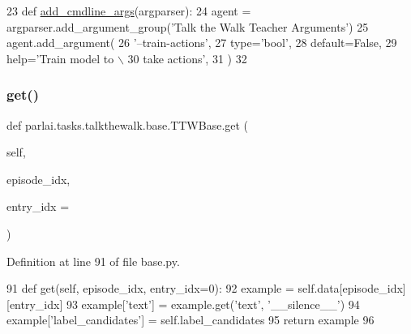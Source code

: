 \begin{DoxyCode}
23     \textcolor{keyword}{def }\hyperlink{namespaceparlai_1_1agents_1_1drqa_1_1config_a62fdd5554f1da6be0cba185271058320}{add\_cmdline\_args}(argparser):
24         agent = argparser.add\_argument\_group(\textcolor{stringliteral}{'Talk the Walk Teacher Arguments'})
25         agent.add\_argument(
26             \textcolor{stringliteral}{'--train-actions'},
27             type=\textcolor{stringliteral}{'bool'},
28             default=\textcolor{keyword}{False},
29             help=\textcolor{stringliteral}{'Train model to \(\backslash\)}
30 \textcolor{stringliteral}{                           take actions'},
31         )
32 
\end{DoxyCode}
\mbox{\label{classparlai_1_1tasks_1_1talkthewalk_1_1base_1_1TTWBase_adda57628371cdbb1afef6f297dab7c54}} 
\subsubsection{\texorpdfstring{get()}{get()}}
{\footnotesize\ttfamily def parlai.\+tasks.\+talkthewalk.\+base.\+T\+T\+W\+Base.\+get (\begin{DoxyParamCaption}\item[{}]{self,  }\item[{}]{episode\+\_\+idx,  }\item[{}]{entry\+\_\+idx = {} }\end{DoxyParamCaption})}



Definition at line 91 of file base.\+py.


\begin{DoxyCode}
91     \textcolor{keyword}{def }get(self, episode\_idx, entry\_idx=0):
92         example = self.data[episode\_idx][entry\_idx]
93         example[\textcolor{stringliteral}{'text'}] = example.get(\textcolor{stringliteral}{'text'}, \textcolor{stringliteral}{'\_\_silence\_\_'})
94         example[\textcolor{stringliteral}{'label\_candidates'}] = self.label\_candidates
95         \textcolor{keywordflow}{return} example
96 
\end{DoxyCode}
\mbox{\label{classparlai_1_1tasks_1_1talkthewalk_1_1base_1_1TTWBase_ab4890c4569ff31724718ed8c684e1a76}} 
